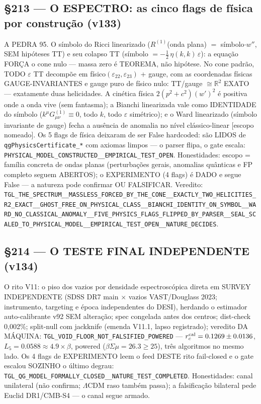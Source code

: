 \documentclass[11pt]{article}
\theoremstyle{definition}\newtheorem{deriv}{Derivação}
\begin{document}
\subsection*{\S213 --- O ESPECTRO: as cinco flags de física por construção (v133)}A PEDRA 95. O símbolo do Ricci linearizado ($R^{(1)}$(onda plana) $=$ símbolo$\cdot w''$, SEM hipóteses TT) e seu colapso TT (símbolo $= -\tfrac12\,\eta(k,k)\,\varepsilon$): a equação FORÇA o cone nulo --- massa zero é TEOREMA, não hipótese. No cone padrão, TODO $\varepsilon$ TT decompõe em físico$(\varepsilon_{22},\varepsilon_{23})$ + gauge, com as coordenadas físicas GAUGE-INVARIANTES e gauge puro de físico nulo: TT/gauge $\cong\mathbb{R}^2$ EXATO --- exatamente duas helicidades. A cinética física $2(p^2+c^2)(w')^2$ é positiva onde a onda vive (sem fantasma); a Bianchi linearizada vale como IDENTIDADE do símbolo ($k^\mu G^{(1)}_{\mu\nu}\equiv 0$, todo $k$, todo $\varepsilon$ simétrico); e o Ward linearizado (símbolo invariante de gauge) fecha a ausência de anomalia no nível clássico-linear [escopo nomeado]. Os 5 flags de física deixaram de ser False hardcoded: são LIDOS de \texttt{qgPhysicsCertificate\_*} com axiomas limpos --- o parser flipa, o gate escala: \texttt{PHYSICAL\_MODEL\_CONSTRUCTED\_\_EMPIRICAL\_TEST\_OPEN}. Honestidades: escopo = família concreta de ondas planas (perturbações gerais, anomalias quânticas e FP completo seguem ABERTOS); o EXPERIMENTO (4 flags) é DADO e segue False --- a natureza pode confirmar OU FALSIFICAR. Veredito: \texttt{TGL\_THE\_SPECTRUM\_\_MASSLESS\_FORCED\_BY\_THE\_CONE\_\_EXACTLY\_TWO\_HELICITIES\_R2\_EXACT\_\_GHOST\_FREE\_ON\_PHYSICAL\_CLASS\_\_BIANCHI\_IDENTITY\_ON\_SYMBOL\_\_WARD\_NO\_CLASSICAL\_ANOMALY\_\_FIVE\_PHYSICS\_FLAGS\_FLIPPED\_BY\_PARSER\_\_SEAL\_SCALED\_TO\_PHYSICAL\_MODEL\_\_EMPIRICAL\_TEST\_OPEN\_\_NATURE\_DECIDES}.

\subsection*{\S214 --- O TESTE FINAL INDEPENDENTE (v134)}O rito V11: o piso dos vazios por densidade espectroscópica direta em SURVEY INDEPENDENTE (SDSS DR7 main $\times$ vazios VAST/Douglass 2023; instrumento, targeting e época independentes do DESI), herdando o estimador auto-calibrante v92 SEM alteração; spec congelada antes dos centros; dist-check 0{,}002\%; split-null com jackknife (emenda V11.1, lapso registrado); veredito DA MÁQUINA: \texttt{TGL\_VOID\_FLOOR\_NOT\_FALSIFIED\_POWERED} --- $r_c^{\rm cal}=0.1269\pm0.0136$, $L_5=0.0588\approx 4.9\times\beta$, powered ($\beta\Sigma\mu=26.3\ge 25$), três algoritmos no mesmo lado. Os 4 flags de EXPERIMENTO leem o feed DESTE rito fail-closed e o gate escalou SOZINHO o último degrau: \texttt{TGL\_QG\_MODEL\_FORMALLY\_CLOSED\_\_NATURE\_TEST\_COMPLETED}. Honestidades: canal unilateral (não confirma; $\Lambda$CDM raso também passa); a falsificação bilateral pede Euclid DR1/CMB-S4 --- o canal segue armado.
\end{document}
